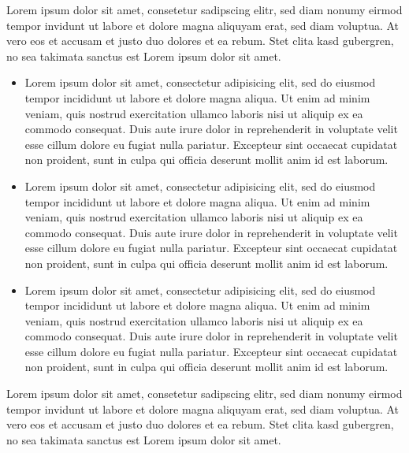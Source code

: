 Lorem ipsum dolor sit amet, consetetur
sadipscing elitr, sed diam nonumy
eirmod tempor invidunt ut labore et
dolore magna aliquyam erat, sed diam
voluptua. At vero eos et accusam et
justo duo dolores et ea rebum. Stet
clita
kasd gubergren, no sea takimata sanctus
est Lorem ipsum dolor sit amet.
\begin{itemize}
	\item Lorem ipsum dolor
	      sit amet,
	      consectetur
	      adipisicing elit,
	      sed do
	      eiusmod tempor
	      incididunt ut
	      labore et dolore
	      magna aliqua. Ut
	      enim ad
	      minim veniam, quis
	      nostrud
	      exercitation
	      ullamco laboris
	      nisi ut aliquip ex
	      ea commodo
	      consequat. Duis
	      aute irure dolor in
	      reprehenderit in
	      voluptate
	      velit esse cillum
	      dolore eu fugiat
	      nulla pariatur.
	      Excepteur sint
	      occaecat
	      cupidatat non
	      proident, sunt in
	      culpa qui officia
	      deserunt mollit
	      anim id
	      est laborum.
	\item Lorem ipsum dolor
	      sit amet,
	      consectetur
	      adipisicing elit,
	      sed do
	      eiusmod tempor
	      incididunt ut
	      labore et dolore
	      magna aliqua. Ut
	      enim ad
	      minim veniam, quis
	      nostrud
	      exercitation
	      ullamco laboris
	      nisi ut aliquip ex
	      ea commodo
	      consequat. Duis
	      aute irure dolor in
	      reprehenderit in
	      voluptate
	      velit esse cillum
	      dolore eu fugiat
	      nulla pariatur.
	      Excepteur sint
	      occaecat
	      cupidatat non
	      proident, sunt in
	      culpa qui officia
	      deserunt mollit
	      anim id
	      est laborum.
	\item Lorem ipsum dolor
	      sit amet,
	      consectetur
	      adipisicing elit,
	      sed do
	      eiusmod tempor
	      incididunt ut
	      labore et dolore
	      magna aliqua. Ut
	      enim ad
	      minim veniam, quis
	      nostrud
	      exercitation
	      ullamco laboris
	      nisi ut aliquip ex
	      ea commodo
	      consequat. Duis
	      aute irure dolor in
	      reprehenderit in
	      voluptate
	      velit esse cillum
	      dolore eu fugiat
	      nulla pariatur.
	      Excepteur sint
	      occaecat
	      cupidatat non
	      proident, sunt in
	      culpa qui officia
	      deserunt mollit
	      anim id
	      est laborum.
\end{itemize}
Lorem ipsum dolor sit amet, consetetur
sadipscing elitr, sed diam nonumy
eirmod tempor invidunt ut labore et
dolore magna aliquyam erat, sed diam
voluptua. At vero eos et accusam et
justo duo dolores et ea rebum. Stet
clita
kasd gubergren, no sea takimata sanctus
est Lorem ipsum dolor sit amet.
